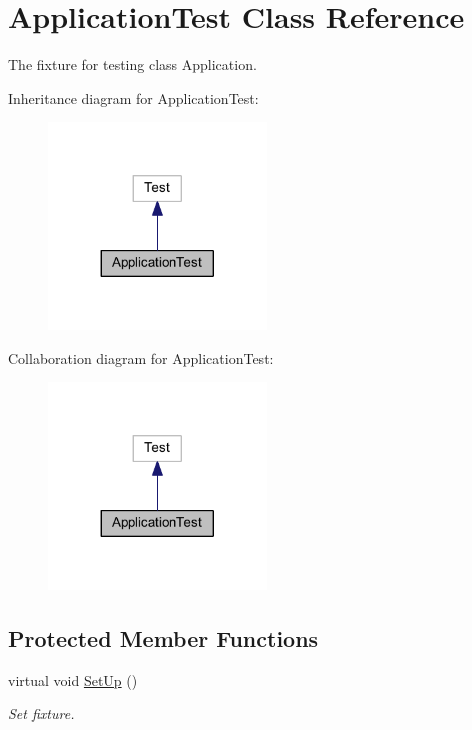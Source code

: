 \hypertarget{class_application_test}{}\section{Application\+Test Class Reference}
\label{class_application_test}


The fixture for testing class Application.  




Inheritance diagram for Application\+Test\+:
\nopagebreak
\begin{figure}[H]
\begin{center}
\leavevmode
\includegraphics[width=164pt]{class_application_test__inherit__graph}
\end{center}
\end{figure}


Collaboration diagram for Application\+Test\+:
\nopagebreak
\begin{figure}[H]
\begin{center}
\leavevmode
\includegraphics[width=164pt]{class_application_test__coll__graph}
\end{center}
\end{figure}
\subsection*{Protected Member Functions}
\begin{DoxyCompactItemize}
\item 
\hypertarget{class_application_test_a0ed0ce167bcb37c85c5c0bec236296d2}{}\label{class_application_test_a0ed0ce167bcb37c85c5c0bec236296d2} 
virtual void \hyperlink{class_application_test_a0ed0ce167bcb37c85c5c0bec236296d2}{Set\+Up} ()
\begin{DoxyCompactList}\small\item\em Set fixture. \end{DoxyCompactList}\end{DoxyCompactItemize}
